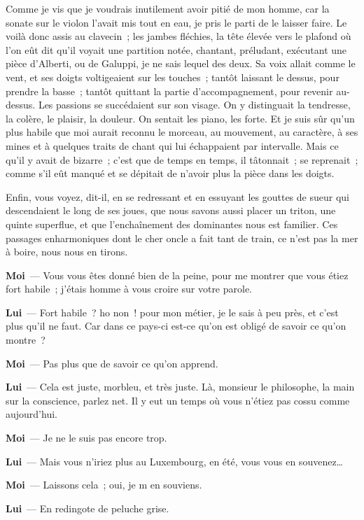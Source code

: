\documentclass[french,twoside]{book} %
\newcommand{\labelchar}[1]{\textbf{\color{rubric} #1}}
\begin{document}
Comme je vis que je voudrais inutilement avoir pitié de mon homme, car la sonate sur le violon l’avait mis tout en eau, je pris le parti de le laisser faire. Le voilà donc assis au clavecin ; les jambes fléchies, la tête élevée vers le plafond où l’on eût dit qu’il voyait une partition notée, chantant, préludant, exécutant une pièce d’Alberti, ou de Galuppi, je ne sais lequel des deux. Sa voix allait comme le vent, et ses doigts voltigeaient sur les touches ; tantôt laissant le dessus, pour prendre la basse ; tantôt quittant la partie d’accompagnement, pour revenir au-dessus. Les passions se succédaient sur son visage. On y distinguait la tendresse, la colère, le plaisir, la douleur. On sentait les piano, les forte. Et je suis sûr qu’un plus habile que moi aurait reconnu le morceau, au mouvement, au caractère, à ses mines et à quelques traits de chant qui lui échappaient par intervalle. Mais ce qu’il y avait de bizarre ; c’est que de temps en temps, il tâtonnait ; se reprenait ; comme s’il eût manqué et se dépitait de n’avoir plus la pièce dans les doigts.\par
Enfin, vous voyez, dit-il, en se redressant et en essuyant les gouttes de sueur qui descendaient le long de ses joues, que nous savons aussi placer un triton, une quinte superflue, et que l’enchaînement des dominantes nous est familier. Ces passages enharmoniques dont le cher oncle a fait tant de train, ce n’est pas la mer à boire, nous nous en tirons.\par
\labelchar{Moi} — Vous vous êtes donné bien de la peine, pour me montrer que vous étiez fort habile ; j’étais homme à vous croire sur votre parole.\par
\labelchar{Lui} — Fort habile ? ho non ! pour mon métier, je le sais à peu près, et c’est plus qu’il ne faut. Car dans ce pays-ci est-ce qu’on est obligé de savoir ce qu’on montre ?\par
\labelchar{Moi} — Pas plus que de savoir ce qu’on apprend.\par
\labelchar{Lui} — Cela est juste, morbleu, et très juste. Là, monsieur le philosophe, la main sur la conscience, parlez net. Il y eut un temps où vous n’étiez pas cossu comme aujourd’hui.\par
\labelchar{Moi} — Je ne le suis pas encore trop.\par
\labelchar{Lui} — Mais vous n’iriez plus au Luxembourg, en été, vous vous en souvenez…\par
\labelchar{Moi} — Laissons cela ; oui, je m en souviens.\par
\labelchar{Lui} — En redingote de peluche grise.\par
\end{document}

